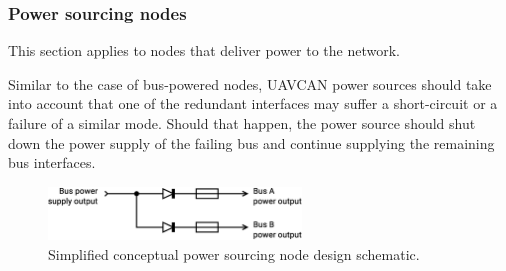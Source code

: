 \subsubsection{Power sourcing nodes}

This section applies to nodes that deliver power to the network.

Similar to the case of bus-powered nodes,
UAVCAN power sources should take into account that one of the redundant interfaces may suffer a
short-circuit or a failure of a similar mode.
Should that happen, the power source should shut down the power supply of the failing bus and continue supplying
the remaining bus interfaces.

\begin{figure}[H]
    \centering
	\includegraphics[width=0.6\textwidth]{physical/redundant_bus_power_source}
	\caption{Simplified conceptual power sourcing node design schematic.\label{fig:physical_redundant_bus_power_source}}
\end{figure}
